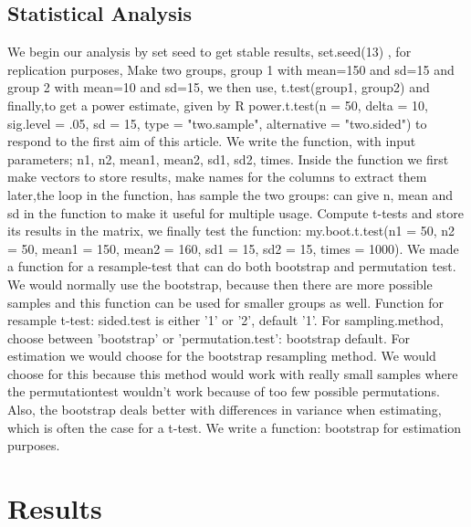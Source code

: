 \documentclass{article}
\begin{document}
\subsection{Statistical Analysis}
We begin our analysis by  set seed to get stable results, set.seed(13) , for replication purposes,  Make two groups, group 1 with mean=150 and sd=15 and group 2 with mean=10 and sd=15, we then use, t.test(group1, group2)  and  finally,to get a power estimate, given by R
power.t.test(n = 50, delta = 10, sig.level = .05, sd = 15, type = "two.sample", alternative = "two.sided") to respond to the first aim of this article. We write the function, with input parameters; n1, n2, mean1, mean2, sd1, sd2, times. Inside the function we first make vectors to store results, make names for the columns to extract them later,the loop in the function, has sample the two groups: can give n, mean and sd in the function to make it useful for multiple usage. Compute t-tests and store its results in the matrix, we finally test the function: 
my.boot.t.test(n1 = 50, n2 = 50, mean1 = 150, mean2 = 160, sd1 = 15, sd2 = 15, times = 1000). 
We made a function for a resample-test that can do both bootstrap and permutation test. We would normally use the bootstrap, because then there are more possible samples and this function can be used for smaller groups as well.
Function for resample t-test: sided.test is either '1' or '2', default '1'. For sampling.method, choose between 'bootstrap' or 'permutation.test': bootstrap default. 
For estimation we would choose for the bootstrap resampling method. We would choose for this because this method would work with really small samples where the permutationtest wouldn't work because of too few possible permutations. Also, the bootstrap deals better with differences in variance when estimating, which is often the case for a t-test. We write a function: bootstrap for estimation purposes.




\section{Results}
\end{document}
